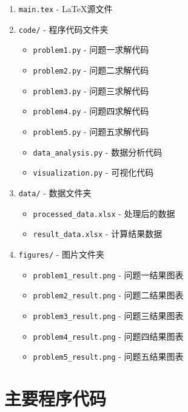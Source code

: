 \documentclass[fontset=SimSun]{ctexart}
\begin{document}
\begin{enumerate}[leftmargin=2.5em]
    \item \texttt{main.tex} - LaTeX源文件
    \item \texttt{code/} - 程序代码文件夹
    \begin{itemize}[leftmargin=2.5em]
        \item \texttt{problem1.py} - 问题一求解代码
        \item \texttt{problem2.py} - 问题二求解代码
        \item \texttt{problem3.py} - 问题三求解代码
        \item \texttt{problem4.py} - 问题四求解代码
        \item \texttt{problem5.py} - 问题五求解代码
        \item \texttt{data\_analysis.py} - 数据分析代码
        \item \texttt{visualization.py} - 可视化代码
    \end{itemize}
    \item \texttt{data/} - 数据文件夹
    \begin{itemize}[leftmargin=2.5em]
        \item \texttt{processed\_data.xlsx} - 处理后的数据
        \item \texttt{result\_data.xlsx} - 计算结果数据
    \end{itemize}
    \item \texttt{figures/} - 图片文件夹
    \begin{itemize}[leftmargin=2.5em]
        \item \texttt{problem1\_result.png} - 问题一结果图表
        \item \texttt{problem2\_result.png} - 问题二结果图表
        \item \texttt{problem3\_result.png} - 问题三结果图表
        \item \texttt{problem4\_result.png} - 问题四结果图表
        \item \texttt{problem5\_result.png} - 问题五结果图表
    \end{itemize}
\end{enumerate}

\section{主要程序代码}
\label{sec:source_code}
\end{document}
